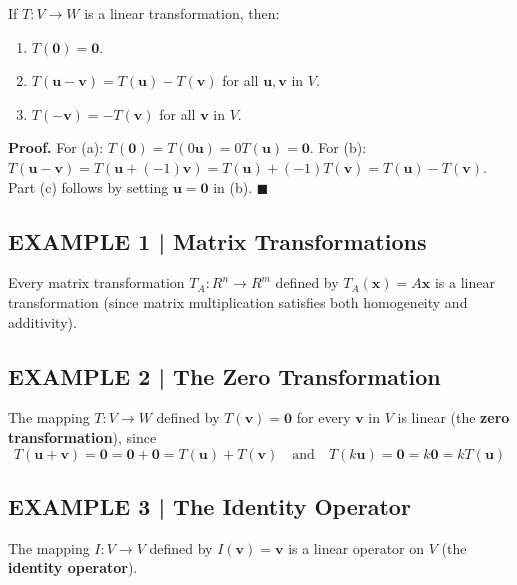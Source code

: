 \documentclass{article}
\begin{document}
\begin{tcolorbox}[colback=red!4, colframe=red!60!black,
  title={\textbf{Theorem 8.1.1}}, boxrule=0.5mm, arc=3mm]
If $T : V \to W$ is a linear transformation, then:
\begin{enumerate}
  \item[(a)] $T(\mathbf{0}) = \mathbf{0}$.
  \item[(b)] $T(\mathbf{u}-\mathbf{v}) = T(\mathbf{u}) - T(\mathbf{v})$ for all $\mathbf{u},\mathbf{v}$ in $V$.
  \item[(c)] $T(-\mathbf{v}) = -T(\mathbf{v})$ for all $\mathbf{v}$ in $V$.
\end{enumerate}
\end{tcolorbox}

\medskip
\textbf{Proof.} For (a): $T(\mathbf{0}) = T(0\mathbf{u}) = 0T(\mathbf{u}) = \mathbf{0}$.
For (b): $T(\mathbf{u}-\mathbf{v}) = T(\mathbf{u}+(-1)\mathbf{v}) = T(\mathbf{u})+(-1)T(\mathbf{v}) = T(\mathbf{u})-T(\mathbf{v})$.
Part (c) follows by setting $\mathbf{u}=\mathbf{0}$ in (b). $\blacksquare$

\subsection*{EXAMPLE 1 | Matrix Transformations}

Every matrix transformation $T_A : R^n \to R^m$ defined by $T_A(\mathbf{x}) = A\mathbf{x}$ is
a linear transformation (since matrix multiplication satisfies both homogeneity and
additivity).

\subsection*{EXAMPLE 2 | The Zero Transformation}

The mapping $T : V \to W$ defined by $T(\mathbf{v}) = \mathbf{0}$ for every $\mathbf{v}$ in $V$
is linear (the \textbf{zero transformation}), since
\[
  T(\mathbf{u}+\mathbf{v}) = \mathbf{0} = \mathbf{0}+\mathbf{0} = T(\mathbf{u})+T(\mathbf{v})
  \quad\text{and}\quad T(k\mathbf{u}) = \mathbf{0} = k\mathbf{0} = kT(\mathbf{u})
\]

\subsection*{EXAMPLE 3 | The Identity Operator}

The mapping $I : V \to V$ defined by $I(\mathbf{v}) = \mathbf{v}$ is a linear operator on $V$
(the \textbf{identity operator}).
\end{document}
